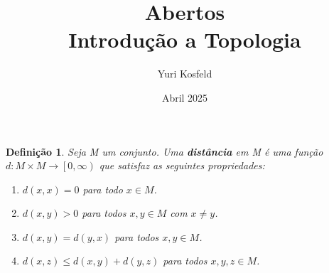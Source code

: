 \documentclass{article}
\title{Abertos \\ \large Introdução a Topologia}
\author{Yuri Kosfeld}
\date{Abril 2025}
\newtheorem*{definition}{Definição}
\begin{document}
\maketitle

\begin{definition}
    Seja M um conjunto. Uma \textbf{distância} em M é uma função $d: M \times M \rightarrow \left[0, \infty \right)$
    que satisfaz as seguintes propriedades: 
    \begin{enumerate}
        \item $d(x,x) = 0$ para todo $x \in M$.
        \item $d(x,y) > 0$ para todos $x, y \in M$ com $x \neq y$.
        \item $d(x, y) = d(y, x)$ para todos $x,y \in M$.
        \item $d(x,z) \leq d(x, y) + d(y, z)$ para todos $x, y, z \in M$.
    \end{enumerate}
\end{definition}
\end{document}
